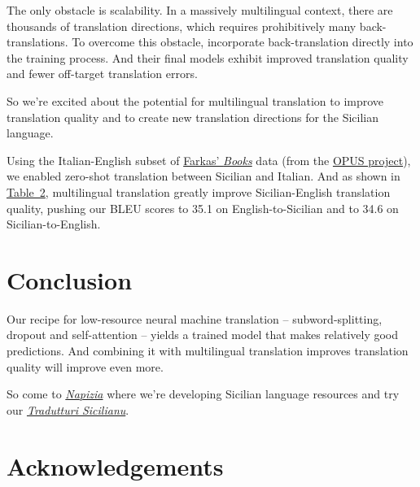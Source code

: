 \documentclass[10pt,letterpaper]{article}
\begin{document}
The only obstacle is scalability.  In a massively multilingual context, there are thousands of
translation directions, which requires prohibitively many back-translations.  To overcome this obstacle,
\citeauthor{zhang2020improving} incorporate back-translation directly into the training process.
And their final models exhibit improved translation quality and fewer off-target translation errors.

So we're excited about the potential for multilingual translation to improve translation quality and
to create new translation directions for the Sicilian language.

Using the Italian-English subset of
\href{https://farkastranslations.com/bilingual_books.php}{Farkas' \textit{Books}} data
(from the \href{https://opus.nlpl.eu/}{OPUS project}),
we enabled zero-shot translation between Sicilian and Italian.
And as shown in \hyperlink{bleuscores}{Table~2}, %
multilingual translation greatly improve Sicilian-English translation quality,
pushing our BLEU scores to 35.1 on English-to-Sicilian and to 34.6 on Sicilian-to-English.



\hypertarget{conclusion}{}

\section*{Conclusion}

Our recipe for low-resource neural machine translation -- subword-splitting,
dropout and self-attention -- yields a trained model that makes relatively good predictions.
And combining it with multilingual translation improves translation quality will improve even more.

So come to \textit{\href{https://www.napizia.com/}{Napizia}}
where we're developing Sicilian language resources
and try our \textit{\href{https://translate.napizia.com/}{Tradutturi Sicilianu}}.



\hypertarget{acknowledgements}{}

\section*{Acknowledgements}
\end{document}
